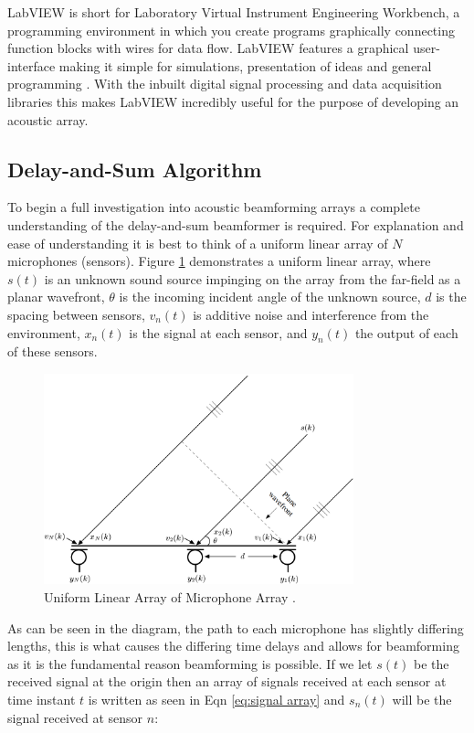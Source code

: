 \documentclass{UoNMCHA}
\numberwithin{equation}{section}
\begin{document}
    LabVIEW is short for Laboratory Virtual Instrument Engineering Workbench, a programming environment in which you create programs graphically connecting function blocks with wires for data flow. LabVIEW features a graphical user-interface making it simple for simulations, presentation of ideas and general programming \citep{Tra06}. With the inbuilt digital signal processing and data acquisition libraries this makes LabVIEW incredibly useful for the purpose of developing an acoustic array.
\subsection{Delay-and-Sum Algorithm} \label{sec:Software DAS}
    To begin a full investigation into acoustic beamforming arrays a complete understanding of the delay-and-sum beamformer is required. For explanation and ease of understanding it is best to think of a uniform linear array of $N$ microphones (sensors). Figure \ref{fig:ULA} demonstrates a uniform linear array, where $s(t)$ is an unknown sound source impinging on the array from the far-field as a planar wavefront, $\theta$ is the incoming incident angle of the unknown source, $d$ is the spacing between sensors, $v_n(t)$ is additive noise and interference from the environment, $x_n(t)$ is the signal at each sensor, and $y_n(t)$ the output of each of these sensors.
    
    \begin{figure} [H]
        \centering
        \includegraphics[keepaspectratio, width = 0.8\textwidth]{Figures/ULA.png}
        \caption{Uniform Linear Array of Microphone Array \citep{Ben08}.}
        \label{fig:ULA}
    \end{figure}
    
    As can be seen in the diagram, the path to each microphone has slightly differing lengths, this is what causes the differing time delays and allows for beamforming as it is the fundamental reason beamforming is possible. If we let $s(t)$ be the received signal at the origin then an array of signals received at each sensor at time instant $t$ is written as seen in Eqn \ref{eq:signal array} and $s_n(t)$ will be the signal received at sensor $n$:
    
\end{document}
